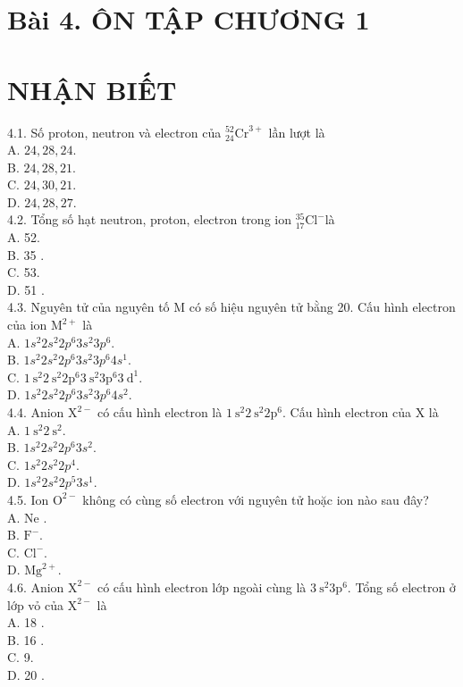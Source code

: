 \documentclass[10pt]{article}
\begin{document}
\section*{Bài 4. ÔN TẬP CHƯƠNG 1}
\section*{NHẬN BIẾT}
4.1. Số proton, neutron và electron của ${ }_{24}^{52} \mathrm{Cr}^{3+}$ lần lượt là\\
A. $24,28,24$.\\
B. $24,28,21$.\\
C. $24,30,21$.\\
D. $24,28,27$.\\
4.2. Tổng số hạt neutron, proton, electron trong ion ${ }_{17}^{35} \mathrm{Cl}^{-}$là\\
A. 52.\\
B. 35 .\\
C. 53.\\
D. 51 .\\
4.3. Nguyên tử của nguyên tố M có số hiệu nguyên tử bằng 20. Cấu hình electron của ion $\mathrm{M}^{2+}$ là\\
A. $1 s^{2} 2 s^{2} 2 p^{6} 3 s^{2} 3 p^{6}$.\\
B. $1 s^{2} 2 s^{2} 2 p^{6} 3 s^{2} 3 p^{6} 4 s^{1}$.\\
C. $1 \mathrm{~s}^{2} 2 \mathrm{~s}^{2} 2 \mathrm{p}^{6} 3 \mathrm{~s}^{2} 3 \mathrm{p}^{6} 3 \mathrm{~d}^{1}$.\\
D. $1 s^{2} 2 s^{2} 2 p^{6} 3 s^{2} 3 p^{6} 4 s^{2}$.\\
4.4. Anion $\mathrm{X}^{2-}$ có cấu hình electron là $1 \mathrm{~s}^{2} 2 \mathrm{~s}^{2} 2 \mathrm{p}^{6}$. Cấu hình electron của X là\\
A. $1 \mathrm{~s}^{2} 2 \mathrm{~s}^{2}$.\\
B. $1 s^{2} 2 s^{2} 2 p^{6} 3 s^{2}$.\\
C. $1 s^{2} 2 s^{2} 2 p^{4}$.\\
D. $1 s^{2} 2 s^{2} 2 p^{5} 3 s^{1}$.\\
4.5. Ion $\mathrm{O}^{2-}$ không có cùng số electron với nguyên tử hoặc ion nào sau đây?\\
A. Ne .\\
B. $\mathrm{F}^{-}$.\\
C. $\mathrm{Cl}^{-}$.\\
D. $\mathrm{Mg}^{2+}$.\\
4.6. Anion $\mathrm{X}^{2-}$ có cấu hình electron lớp ngoài cùng là $3 \mathrm{~s}^{2} 3 \mathrm{p}^{6}$. Tổng số electron ở lớp vỏ của $\mathrm{X}^{2-}$ là\\
A. 18 .\\
B. 16 .\\
C. 9.\\
D. 20 .
\end{document}
